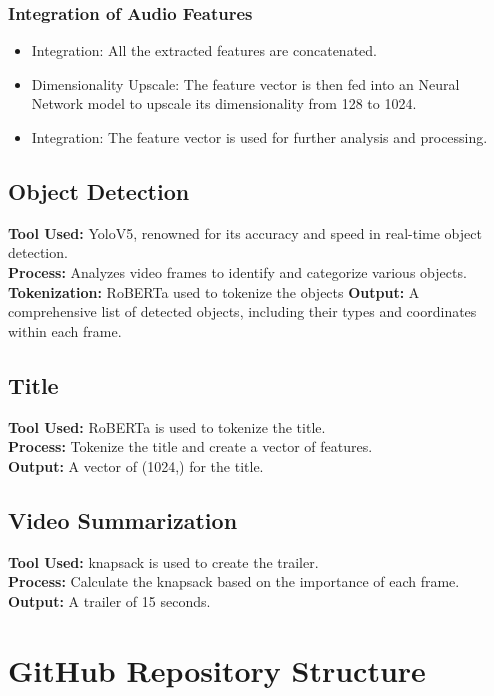 \documentclass[conference]{IEEEtran}
\begin{document}
\subsubsection*{Integration of Audio Features}
    \begin{itemize}
        \item Integration: All the extracted features are concatenated.
        \item Dimensionality Upscale: The feature vector is then fed into an Neural Network model to upscale its dimensionality from 128 to 1024.
        \item Integration: The feature vector is used for further analysis and processing.
    \end{itemize}

\subsection*{Object Detection}
\textbf{Tool Used:} YoloV5, renowned for its accuracy and speed in real-time object detection.\\
\textbf{Process:} Analyzes video frames to identify and categorize various objects.\\ 
\textbf{Tokenization:} RoBERTa used to tokenize the objects
\textbf{Output:} A comprehensive list of detected objects, including their types and coordinates within each frame.

\subsection*{Title}
\textbf{Tool Used:} RoBERTa is used to tokenize the title.\\
\textbf{Process:} Tokenize the title and create a vector of features.\\
\textbf{Output:} A vector of (1024,) for the title.

\subsection{Video Summarization}
\textbf{Tool Used:} knapsack is used to create the trailer.\\
\textbf{Process:} Calculate the knapsack based on the importance of each frame.\\
\textbf{Output:} A trailer of 15 seconds.


\section{GitHub Repository Structure}
\end{document}
